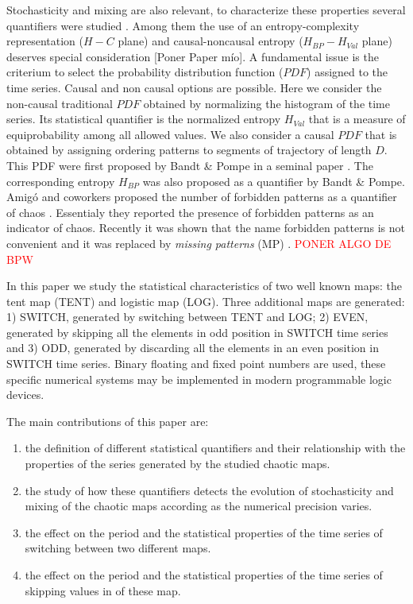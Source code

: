 Stochasticity and mixing are also relevant, to characterize these properties several quantifiers were studied \cite{DeMicco2009}.
Among them the use of an entropy-complexity representation ($H-C$ plane) and causal-noncausal entropy ($H_{BP}-H_{Val}$ plane) deserves special consideration \cite{Rosso2007C,DeMicco2008,DeMicco2011,DeMicco2009,Rosso2009}[Poner Paper mío].
A fundamental issue is the criterium to select the probability distribution function ($PDF$) assigned to the time series.
Causal and non causal options are possible.
Here we consider the non-causal traditional $PDF$ obtained by normalizing the histogram of the time series.
Its statistical quantifier is the normalized entropy $H_{Val}$ that is a measure of equiprobability among all allowed values.
We also consider a causal $PDF$ that is obtained by assigning ordering patterns to segments of trajectory of length $D$.
This PDF were first proposed by Bandt \& Pompe in a seminal paper \cite{Pompe2002}.
The corresponding entropy $H_{BP}$ was also proposed as a quantifier by Bandt \& Pompe.
Amig\'o and coworkers proposed the number of forbidden patterns as a quantifier of chaos \cite{Amigo2007b}.
Essentialy they reported the presence of forbidden patterns as an indicator of chaos.
Recently it was shown that the name forbidden patterns is not convenient and it was replaced by \textit{missing patterns }(MP) \cite{Rosso2012b}.
\textcolor{red}{PONER ALGO DE BPW}

In this paper we study the statistical characteristics of two well known maps: the tent map (TENT) and logistic map (LOG).
Three additional maps are generated: 1) SWITCH, generated by switching between TENT and LOG; 2) EVEN, generated by skipping all the elements in odd position in SWITCH time series and 3) ODD, generated by discarding all the elements in an even position in SWITCH time series.
Binary floating and fixed point numbers are used, these specific numerical systems may be implemented in modern programmable logic devices.

The main contributions of this paper are:
\begin{enumerate}
\item the definition of different statistical quantifiers and their relationship with the properties of the series generated by the studied chaotic maps.
\item the study of how these quantifiers detects the evolution of stochasticity and mixing of the chaotic maps according as the numerical precision varies.
\item the effect on the period and the statistical properties of the time series of switching between two different maps.
\item the effect on the period and the statistical properties of the time series of skipping values in of these map.
\end{enumerate}

